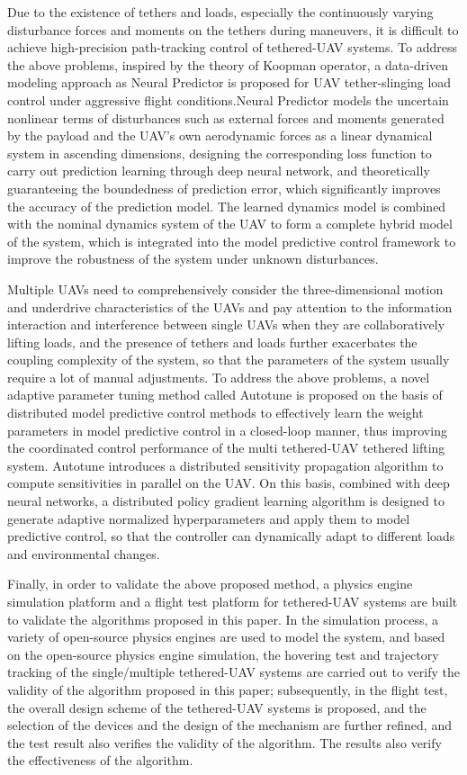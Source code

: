 \documentclass[lang=chs, degree=master, blindreview=false, winfonts=true]{yanputhesis}
\begin{document}
\begin{engabstract}
	Due to the existence of tethers and loads, especially the continuously varying disturbance forces and moments on the tethers during maneuvers, it is difficult to achieve high-precision path-tracking control of tethered-UAV systems. To address the above problems, inspired by the theory of Koopman operator, a data-driven modeling approach as Neural Predictor is proposed for UAV tether-slinging load control under aggressive flight conditions.Neural Predictor models the uncertain nonlinear terms of disturbances such as external forces and moments generated by the payload and the UAV's own aerodynamic forces as a linear dynamical system in ascending dimensions, designing the corresponding loss function to carry out prediction learning through deep neural network, and theoretically guaranteeing the boundedness of prediction error, which significantly improves the accuracy of the prediction model. The learned dynamics model is combined with the nominal dynamics system of the UAV to form a complete hybrid model of the system, which is integrated into the model predictive control framework to improve the robustness of the system under unknown disturbances.
	
	Multiple UAVs need to comprehensively consider the three-dimensional motion and underdrive characteristics of the UAVs and pay attention to the information interaction and interference between single UAVs when they are collaboratively lifting loads, and the presence of tethers and loads further exacerbates the coupling complexity of the system, so that the parameters of the system usually require a lot of manual adjustments. To address the above problems, a novel adaptive parameter tuning method called Autotune is proposed on the basis of distributed model predictive control methods to effectively learn the weight parameters in model predictive control in a closed-loop manner, thus improving the coordinated control performance of the multi tethered-UAV tethered lifting system. Autotune introduces a distributed sensitivity propagation algorithm to compute sensitivities in parallel on the UAV. On this basis, combined with deep neural networks, a distributed policy gradient learning algorithm is designed to generate adaptive normalized hyperparameters and apply them to model predictive control, so that the controller can dynamically adapt to different loads and environmental changes.
	
	
	Finally, in order to validate the above proposed method, a physics engine simulation platform and a flight test platform for tethered-UAV systems are built to validate the algorithms proposed in this paper. In the simulation process, a variety of open-source physics engines are used to model the system, and based on the open-source physics engine simulation, the hovering test and trajectory tracking of the single/multiple tethered-UAV systems are carried out to verify the validity of the algorithm proposed in this paper; subsequently, in the flight test, the overall design scheme of the tethered-UAV systems is proposed, and the selection of the devices and the design of the mechanism are further refined, and the test result also verifies the validity of the algorithm. The results also verify the effectiveness of the algorithm.
	

\end{engabstract}
\end{document}
